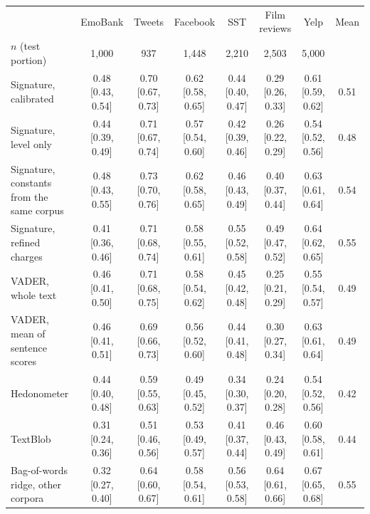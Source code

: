 \begin{tabular}{@{}lccccccc@{}}
\toprule
 & EmoBank & Tweets & Facebook & SST & Film reviews & Yelp & Mean \\
$n$ (test portion) & 1,000 & 937 & 1,448 & 2,210 & 2,503 & 5,000 & \\
\midrule
Signature, calibrated & 0.48 {\scriptsize[0.43, 0.54]} & 0.70 {\scriptsize[0.67, 0.73]} & 0.62 {\scriptsize[0.58, 0.65]} & 0.44 {\scriptsize[0.40, 0.47]} & 0.29 {\scriptsize[0.26, 0.33]} & 0.61 {\scriptsize[0.59, 0.62]} & 0.51 \\
Signature, level only & 0.44 {\scriptsize[0.39, 0.49]} & 0.71 {\scriptsize[0.67, 0.74]} & 0.57 {\scriptsize[0.54, 0.60]} & 0.42 {\scriptsize[0.39, 0.46]} & 0.26 {\scriptsize[0.22, 0.29]} & 0.54 {\scriptsize[0.52, 0.56]} & 0.48 \\
Signature, constants from the same corpus & 0.48 {\scriptsize[0.43, 0.55]} & 0.73 {\scriptsize[0.70, 0.76]} & 0.62 {\scriptsize[0.58, 0.65]} & 0.46 {\scriptsize[0.43, 0.49]} & 0.40 {\scriptsize[0.37, 0.44]} & 0.63 {\scriptsize[0.61, 0.64]} & 0.54 \\
Signature, refined charges & 0.41 {\scriptsize[0.36, 0.46]} & 0.71 {\scriptsize[0.68, 0.74]} & 0.58 {\scriptsize[0.55, 0.61]} & 0.55 {\scriptsize[0.52, 0.58]} & 0.49 {\scriptsize[0.47, 0.52]} & 0.64 {\scriptsize[0.62, 0.65]} & 0.55 \\
VADER, whole text & 0.46 {\scriptsize[0.41, 0.50]} & 0.71 {\scriptsize[0.68, 0.75]} & 0.58 {\scriptsize[0.54, 0.62]} & 0.45 {\scriptsize[0.42, 0.48]} & 0.25 {\scriptsize[0.21, 0.29]} & 0.55 {\scriptsize[0.54, 0.57]} & 0.49 \\
VADER, mean of sentence scores & 0.46 {\scriptsize[0.41, 0.51]} & 0.69 {\scriptsize[0.66, 0.73]} & 0.56 {\scriptsize[0.52, 0.60]} & 0.44 {\scriptsize[0.41, 0.48]} & 0.30 {\scriptsize[0.27, 0.34]} & 0.63 {\scriptsize[0.61, 0.64]} & 0.49 \\
Hedonometer & 0.44 {\scriptsize[0.40, 0.48]} & 0.59 {\scriptsize[0.55, 0.63]} & 0.49 {\scriptsize[0.45, 0.52]} & 0.34 {\scriptsize[0.30, 0.37]} & 0.24 {\scriptsize[0.20, 0.28]} & 0.54 {\scriptsize[0.52, 0.56]} & 0.42 \\
TextBlob & 0.31 {\scriptsize[0.24, 0.36]} & 0.51 {\scriptsize[0.46, 0.56]} & 0.53 {\scriptsize[0.49, 0.57]} & 0.41 {\scriptsize[0.37, 0.44]} & 0.46 {\scriptsize[0.43, 0.49]} & 0.60 {\scriptsize[0.58, 0.61]} & 0.44 \\
Bag-of-words ridge, other corpora & 0.32 {\scriptsize[0.27, 0.40]} & 0.64 {\scriptsize[0.60, 0.67]} & 0.58 {\scriptsize[0.54, 0.61]} & 0.56 {\scriptsize[0.53, 0.58]} & 0.64 {\scriptsize[0.61, 0.66]} & 0.67 {\scriptsize[0.65, 0.68]} & 0.55 \\

\end{tabular}
